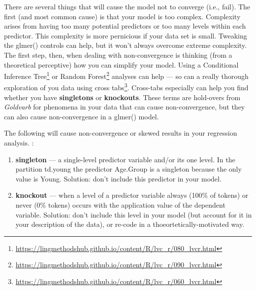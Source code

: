 \documentclass[
  10pt,
  letterpaper]{article}
\providecommand{\tightlist}{%
  \setlength{\itemsep}{0pt}\setlength{\parskip}{0pt}}\usepackage{longtable,booktabs,array}
\renewcommand\texttt[1]{{\ttfamily\color{BrickRed}#1}}
\DeclareRobustCommand{\href}[2]{#2\footnote{\url{#1}}}
\begin{document}
\begin{tcolorbox}[enhanced jigsaw, colbacktitle=quarto-callout-note-color!10!white, left=2mm, breakable, opacityback=0, toprule=.15mm, titlerule=0mm, bottomtitle=1mm, colframe=quarto-callout-note-color-frame, opacitybacktitle=0.6, coltitle=black, leftrule=.75mm, toptitle=1mm, rightrule=.15mm, title=\textcolor{quarto-callout-note-color}{\faInfo}\hspace{0.5em}{What causes non-convergence?}, bottomrule=.15mm, colback=white, arc=.35mm]

There are several things that will cause the model not to converge
(i.e., fail). The first (and most common cause) is that your model is
too complex. Complexity arises from having too many potential predictors
or too many levels within each predictor. This complexity is more
pernicious if your data set is small. Tweaking the \texttt{glmer()}
controls can help, but it won't always overcome extreme complexity. The
first step, then, when dealing with non-convergence is thinking (from a
theoretical perceptive) how you can simplify your model. Using a
\href{https://lingmethodshub.github.io/content/R/lvc_r/080_lvcr.html}{Conditional
Inference Tree} or
\href{https://lingmethodshub.github.io/content/R/lvc_r/090_lvcr.html}{Random
Forest} analyses can help --- so can a really thorough exploration of
you data using
\href{https://lingmethodshub.github.io/content/R/lvc_r/060_lvcr.html}{cross
tabs}. Cross-tabs especially can help you find whether you have
\textbf{singletons} or \textbf{knockouts}. These terms are hold-overs
from \emph{Goldvarb} for phenomena in your data that can cause
non-convergence, but they can also cause non-convergence in a
\texttt{glmer()} model.

The following will cause non-convergence or skewed results in your
regression analysis. :

\begin{enumerate}
\def\labelenumi{\arabic{enumi}.}
\tightlist
\item
  \textbf{singleton} --- a single-level predictor variable and/or its
  one level. In the partition \texttt{td.young} the predictor
  \texttt{Age.Group} is a singleton because the only value is
  \texttt{Young}. Solution: don't include this predictor in your model.
\item
  \textbf{knockout} --- when a level of a predictor variable always
  (100\% of tokens) or never (0\% tokens) occurs with the application
  value of the dependent variable. Solution: don't include this level in
  your model (but account for it in your description of the data), or
  re-code in a thoeortetically-motivated way.
\end{enumerate}

\end{tcolorbox}
\end{document}
